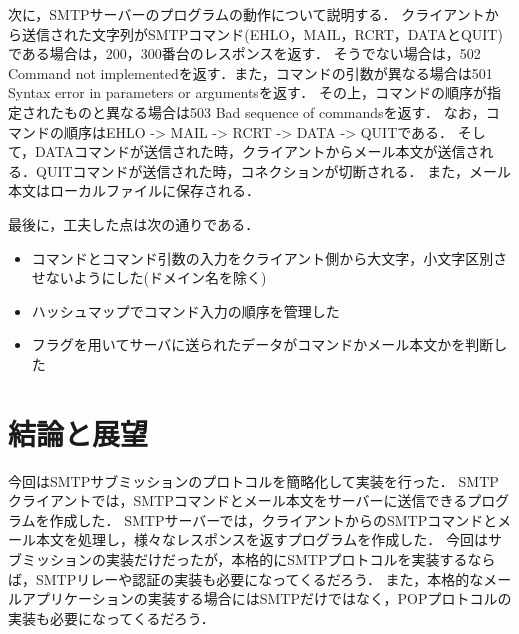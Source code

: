 \documentclass[dvipdfmx,a4paper]{jsarticle}
\theoremstyle{definition}
\begin{document}
次に，SMTPサーバーのプログラムの動作について説明する．
クライアントから送信された文字列がSMTPコマンド(EHLO，MAIL，RCRT，DATAとQUIT)である場合は，200，300番台のレスポンスを返す．
そうでない場合は，502  Command not implementedを返す．また，コマンドの引数が異なる場合は501  Syntax error in parameters or argumentsを返す．
その上，コマンドの順序が指定されたものと異なる場合は503  Bad sequence of commandsを返す．
なお，コマンドの順序はEHLO -> MAIL -> RCRT -> DATA -> QUITである．
そして，DATAコマンドが送信された時，クライアントからメール本文が送信される．QUITコマンドが送信された時，コネクションが切断される．
また，メール本文はローカルファイルに保存される．




最後に，工夫した点は次の通りである．
\begin{itemize}
  \item コマンドとコマンド引数の入力をクライアント側から大文字，小文字区別させないようにした(ドメイン名を除く)
  \item ハッシュマップでコマンド入力の順序を管理した
  \item フラグを用いてサーバに送られたデータがコマンドかメール本文かを判断した
\end{itemize}



\section{結論と展望}
今回はSMTPサブミッションのプロトコルを簡略化して実装を行った．
SMTPクライアントでは，SMTPコマンドとメール本文をサーバーに送信できるプログラムを作成した．
SMTPサーバーでは，クライアントからのSMTPコマンドとメール本文を処理し，様々なレスポンスを返すプログラムを作成した．
今回はサブミッションの実装だけだったが，本格的にSMTPプロトコルを実装するならば，SMTPリレーや認証の実装も必要になってくるだろう．
また，本格的なメールアプリケーションの実装する場合にはSMTPだけではなく，POPプロトコルの実装も必要になってくるだろう．
\end{document}
